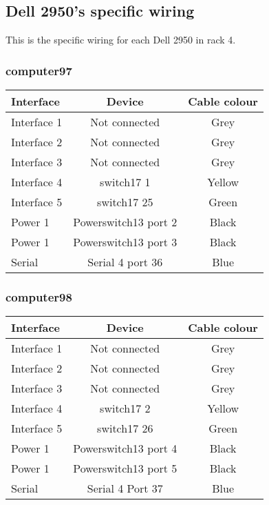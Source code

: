 \subsection{Dell 2950's specific wiring}

This is the specific wiring for each Dell 2950 in rack 4.

\subsubsection{computer97}

\begin{table}[H]
\begin{tabular}{|l|c|c|}\hline
Interface & Device & Cable colour \\ \hline
Interface 1 & Not connected & Grey \\
Interface 2 & Not connected & Grey \\
Interface 3 & Not connected & Grey \\
Interface 4 & switch17 1 & Yellow \\
Interface 5 & switch17 25 & Green \\
Power 1 & Powerswitch13 port 2 & Black \\
Power 1 & Powerswitch13 port 3 & Black \\
Serial & Serial 4 port 36 & Blue \\ \hline
\end{tabular}
\end{table}

\subsubsection{computer98}

\begin{table}[H]
\begin{tabular}{|l|c|c|}\hline
Interface & Device & Cable colour \\ \hline
Interface 1 & Not connected & Grey \\
Interface 2 & Not connected & Grey \\
Interface 3 & Not connected & Grey \\
Interface 4 & switch17 2 & Yellow \\
Interface 5 & switch17 26 & Green \\
Power 1 & Powerswitch13 port 4 & Black \\
Power 1 & Powerswitch13 port 5 & Black \\
Serial & Serial 4 Port 37 & Blue \\ \hline
\end{tabular}
\end{table}

